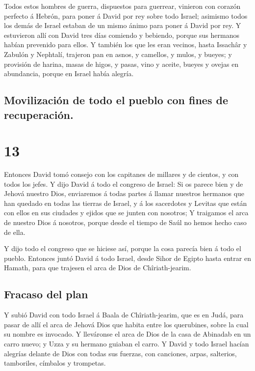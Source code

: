  Todos estos hombres de guerra, dispuestos para guerrear,
vinieron con corazón perfecto á Hebrón, para poner á David por rey sobre
todo Israel; asimismo todos los demás de Israel estaban de un mismo
ánimo para poner á David por rey.  Y estuvieron allí con
David tres días comiendo y bebiendo, porque sus hermanos habían
prevenido para ellos.  Y también los que les eran vecinos,
hasta Issachâr y Zabulón y Nephtalí, trajeron pan en asnos, y camellos,
y mulos, y bueyes; y provisión de harina, masas de higos, y pasas, vino
y aceite, bueyes y ovejas en abundancia, porque en Israel había alegría.

\hypertarget{movilizaciuxf3n-de-todo-el-pueblo-con-fines-de-recuperaciuxf3n.}{%
\subsection{Movilización de todo el pueblo con fines de
recuperación.}\label{movilizaciuxf3n-de-todo-el-pueblo-con-fines-de-recuperaciuxf3n.}}

\hypertarget{section-12}{%
\section{13}\label{section-12}}

 Entonces David tomó consejo con los capitanes de millares y
de cientos, y con todos los jefes.  Y dijo David á todo el
congreso de Israel: Si os parece bien y de Jehová nuestro Dios,
enviaremos á todas partes á llamar nuestros hermanos que han quedado en
todas las tierras de Israel, y á los sacerdotes y Levitas que están con
ellos en sus ciudades y ejidos que se junten con nosotros; 
Y traigamos el arca de nuestro Dios á nosotros, porque desde el tiempo
de Saúl no hemos hecho caso de ella.

 Y dijo todo el congreso que se hiciese así, porque la cosa
parecía bien á todo el pueblo.  Entonces juntó David á todo
Israel, desde Sihor de Egipto hasta entrar en Hamath, para que trajesen
el arca de Dios de Chîriath-jearim.

\hypertarget{fracaso-del-plan}{%
\subsection{Fracaso del plan}\label{fracaso-del-plan}}

 Y subió David con todo Israel á Baala de Chîriath-jearim,
que es en Judá, para pasar de allí el arca de Jehová Dios que habita
entre los querubines, sobre la cual su nombre es invocado. 
Y lleváronse el arca de Dios de la casa de Abinadab en un carro nuevo; y
Uzza y su hermano guiaban el carro.  Y David y todo Israel
hacían alegrías delante de Dios con todas sus fuerzas, con canciones,
arpas, salterios, tamboriles, címbalos y trompetas.

